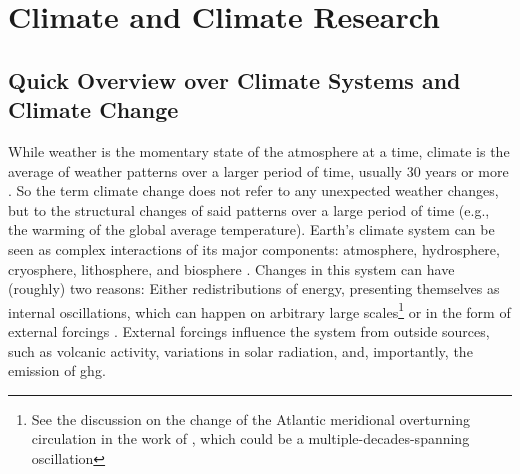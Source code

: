%
%
%


\section{Climate and Climate Research}
\label{sec:climate}



\subsection{Quick Overview over Climate Systems and Climate Change}


While weather is the momentary state of the atmosphere at a time, climate is the average of weather patterns over a larger period of time, usually 30 years or more \cite{noaa_whats_nodate}. 
So the term climate change does not refer to any unexpected weather changes, but to the structural changes of said patterns over a large period of time (e.g., the warming of the global average temperature). 
Earth's climate system can be seen as complex interactions of its major components: atmosphere, hydrosphere, cryosphere, lithosphere, and biosphere \cite{vietinghoffdiss, intergovernmental_panel_on_climate_change_ipcc_climate_2023}. 
Changes in this system can have (roughly) two reasons: 
Either redistributions of energy, presenting themselves as internal oscillations, which can happen on arbitrary large scales\footnote{See the discussion on the change of the Atlantic meridional overturning circulation in the work of , which could be a multiple-decades-spanning oscillation} or in the form of external forcings \cite{vietinghoffdiss}. 
External forcings influence the system from outside sources, such as volcanic activity, variations in solar radiation, and, importantly, the emission of \ac{ghg}. 

